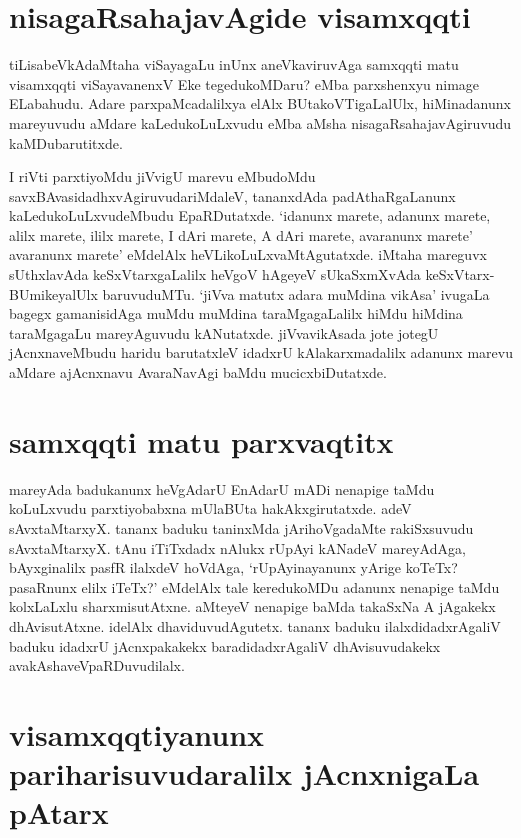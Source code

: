 \section*{nisagaRsahajavAgide visamxqqti}

tiLisabeVkAdaMtaha viSayagaLu inUnx aneVkaviruvAga samxqqti matu visamxqqti viSayavanenxV Eke tegedukoMDaru? eMba parxshenxyu nimage ELabahudu. Adare parxpaMcadalilxya elAlx BUtakoVTigaLalUlx, hiMinadanunx mareyuvudu aMdare kaLedukoLuLxvudu eMba aMsha nisagaRsahajavAgiruvudu kaMDubarutitxde.

I riVti parxtiyoMdu jiVvigU marevu eMbudoMdu savxBAvasidadhxvAgiruvudariMdaleV, tananxdAda padAthaRgaLanunx kaLedukoLuLxvudeMbudu EpaRDutatxde. `idanunx marete, adanunx marete, alilx marete, ililx marete, I dAri marete, A dAri marete, avaranunx marete' avaranunx marete' eMdelAlx heVLikoLuLxvaMtAgutatxde. iMtaha mareguvx sUthxlavAda keSxVtarxgaLalilx heVgoV hAgeyeV sUkaSxmXvAda keSxVtarx-BUmikeyalUlx baruvuduMTu. `jiVva matutx adara muMdina vikAsa' ivugaLa bagegx gamanisidAga muMdu muMdina taraMgagaLalilx hiMdu hiMdina taraMgagaLu mareyAguvudu kANutatxde. jiVvavikAsada jote jotegU jAcnxnaveMbudu haridu barutatxleV idadxrU kAlakarxmadalilx adanunx marevu aMdare ajAcnxnavu AvaraNavAgi baMdu mucicxbiDutatxde. 

\section*{samxqqti matu parxvaqtitx}

mareyAda badukanunx heVgAdarU EnAdarU mADi nenapige taMdu koLuLxvudu parxtiyobabxna mUlaBUta hakAkxgirutatxde. adeV sAvxtaMtarxyX. tananx baduku taninxMda jArihoVgadaMte rakiSxsuvudu sAvxtaMtarxyX. tAnu iTiTxdadx nAlukx rUpAyi kANadeV mareyAdAga, bAyxginalilx pasfR ilalxdeV hoVdAga, `rUpAyinayanunx yArige koTeTx? pasaRnunx elilx iTeTx?' eMdelAlx tale keredukoMDu adanunx nenapige taMdu kolxLaLxlu sharxmisutAtxne. aMteyeV nenapige baMda takaSxNa A jAgakekx dhAvisutAtxne. idelAlx dhaviduvudAgutetx. tananx baduku ilalxdidadxrAgaliV baduku idadxrU jAcnxpakakekx baradidadxrAgaliV dhAvisuvudakekx avakAshaveVpaRDuvudilalx.

\section*{visamxqqtiyanunx pariharisuvudaralilx jAcnxnigaLa pAtarx}

